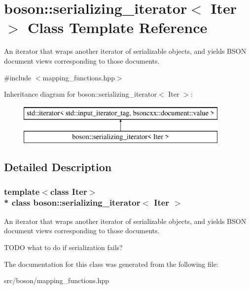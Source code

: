 \hypertarget{classboson_1_1serializing__iterator}{}\section{boson\+:\+:serializing\+\_\+iterator$<$ Iter $>$ Class Template Reference}
\label{classboson_1_1serializing__iterator}


An iterator that wraps another iterator of serializable objects, and yields B\+S\+ON document views corresponding to those documents.  




{\ttfamily \#include $<$mapping\+\_\+functions.\+hpp$>$}

Inheritance diagram for boson\+:\+:serializing\+\_\+iterator$<$ Iter $>$\+:\begin{figure}[H]
\begin{center}
\leavevmode
\includegraphics[height=2.000000cm]{classboson_1_1serializing__iterator}
\end{center}
\end{figure}


\subsection{Detailed Description}
\subsubsection*{template$<$class Iter$>$\\*
class boson\+::serializing\+\_\+iterator$<$ Iter $>$}

An iterator that wraps another iterator of serializable objects, and yields B\+S\+ON document views corresponding to those documents. 

T\+O\+DO what to do if serialization fails? 

The documentation for this class was generated from the following file\+:\begin{DoxyCompactItemize}
\item 
src/boson/mapping\+\_\+functions.\+hpp\end{DoxyCompactItemize}
